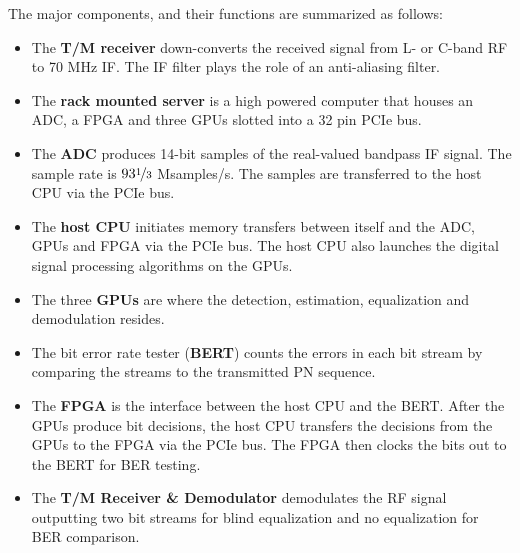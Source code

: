 The major components, and their functions are summarized as follows:
\begin{itemize}
	\item The \textbf{T/M receiver} down-converts the received signal from L- or C-band RF to 70 MHz IF.
	The IF filter plays the role of an anti-aliasing filter.
	\item The \textbf{rack mounted server} is a high powered computer that houses an ADC, a FPGA and three GPUs 		slotted into a 32 pin PCIe bus.
	\item The \textbf{ADC} produces 14-bit samples of the real-valued bandpass IF signal.
	The sample rate is $93\nicefrac{1}{3}$ Msamples/s.
	The samples are transferred to the host CPU via the PCIe bus.
	\item The \textbf{host CPU} initiates memory transfers between itself and the ADC, GPUs and FPGA via the PCIe 	bus. 
	The host CPU also launches the digital signal processing algorithms on the GPUs.
	\item The three \textbf{GPUs} are where the detection, estimation, equalization and demodulation resides.
	\item The bit error rate tester (\textbf{BERT}) counts the errors in each bit stream by comparing the 		streams to the transmitted PN sequence.
	\item The \textbf{FPGA} is the interface between the host CPU and the BERT. After the GPUs produce bit decisions, the host CPU transfers the decisions from the GPUs to the FPGA via the PCIe bus. The FPGA then clocks the bits out to the BERT for BER testing.
	\item The \textbf{T/M Receiver \& Demodulator} demodulates the RF signal outputting two bit streams for blind equalization and no equalization for BER comparison.
\end{itemize}

